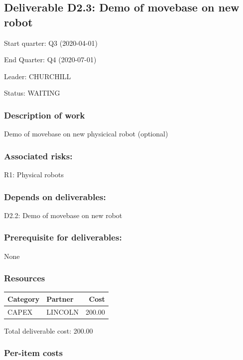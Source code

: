 \documentclass[english]{article}
\begin{document}
\newpage\subsection*{Deliverable D2.3: Demo of movebase on new robot}

Start quarter: Q3 (2020-04-01) 
 
 End Quarter: Q4 (2020-07-01) 

 Leader: CHURCHILL

  Status: WAITING 

 \subsubsection*{Description of work}

Demo of movebase on new physicical robot (optional)

\subsubsection*{Associated risks:}

R1: Physical robots

\subsubsection*{Depends on deliverables:}

D2.2: Demo of movebase on new robot



\subsubsection*{Prerequisite for deliverables:}

None



\subsubsection*{Resources}

\begin{tabular}{ | l | l | r | }
\hline
 Category & Partner & Cost \\ 
 \hline
 CAPEX & LINCOLN &  200.00 \\ 
\hline
 \end{tabular}

Total deliverable cost:  200.00

\subsubsection*{Per-item costs}
\end{document}
